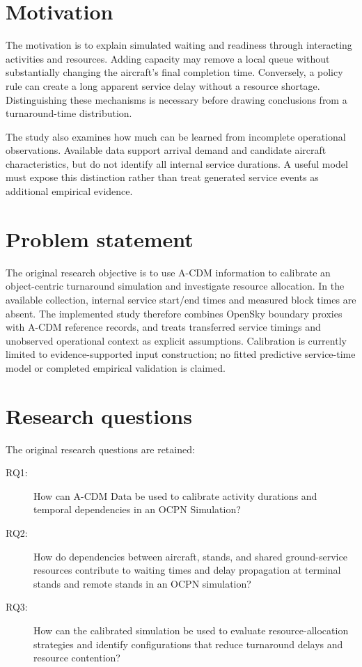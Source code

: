\section{Motivation}
The motivation is to explain simulated waiting and readiness through interacting activities and resources. Adding capacity may remove a local queue without substantially changing the aircraft's final completion time. Conversely, a policy rule can create a long apparent service delay without a resource shortage. Distinguishing these mechanisms is necessary before drawing conclusions from a turnaround-time distribution.

The study also examines how much can be learned from incomplete operational observations. Available data support arrival demand and candidate aircraft characteristics, but do not identify all internal service durations. A useful model must expose this distinction rather than treat generated service events as additional empirical evidence.

\section{Problem statement}
The original research objective is to use A-CDM information to calibrate an object-centric turnaround simulation and investigate resource allocation. In the available collection, internal service start/end times and measured block times are absent. The implemented study therefore combines OpenSky boundary proxies with A-CDM reference records, and treats transferred service timings and unobserved operational context as explicit assumptions. Calibration is currently limited to evidence-supported input construction; no fitted predictive service-time model or completed empirical validation is claimed.

\section{Research questions}
The original research questions are retained:
\begin{description}
\item[RQ1:] How can A-CDM Data be used to calibrate activity durations and temporal dependencies in an OCPN Simulation?
\item[RQ2:] How do dependencies between aircraft, stands, and shared ground-service resources contribute to waiting times and delay propagation at terminal stands and remote stands in an OCPN simulation?
\item[RQ3:] How can the calibrated simulation be used to evaluate resource-allocation strategies and identify configurations that reduce turnaround delays and resource contention?
\end{description}

